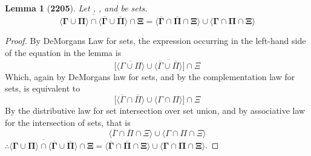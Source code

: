 \documentclass[preview]{standalone}
\newtheorem*{lemma*}{Lemma}
\begin{document}
\begin{lemma*}[\textbf{2205}] \color{black}
    Let \bm{$\Gamma$}, \bm{$\Pi$}, and \bm{$\Xi$} be sets.
    \begin{equation*}
        \bm{
            \overline{
                \Big \langle \Gamma \cup \Pi \Big \rangle
                    \cap
                \Big \langle \overline{\Gamma} \cup \overline{\Pi} \Big \rangle
            }
                \cap
            \Xi
                    =
            \Big \langle \overline{\Gamma} \cap \overline{\Pi} \cap \Xi \Big \rangle
                \cup
            \Big \langle \Gamma \cap \Pi \cap \Xi \Big \rangle
        }
    \end{equation*}
\end{lemma*}
\begin{proof} \color{black}
    By DeMorgans Law for sets, 
    the expression occurring in the left-hand side of the equation in the lemma is
    \begin{equation*}
        \bigg[
            \Big \langle \overline{\Gamma \cup \Pi} \Big \rangle
                \cup
            \Big \langle \overline{\overline{\Gamma} \cup \overline{\Pi}} \Big \rangle
        \bigg]
            \cap
        \Xi
    \end{equation*}
    Which, again by DeMorgans law for sets, and by the complementation law for sets, is equivalent to
    \begin{equation*}
        \bigg[
            \Big \langle \overline{\Gamma} \cap \overline{\Pi} \Big \rangle
                \cup
            \Big \langle \Gamma \cap \Pi \Big \rangle
        \bigg]
            \cap
        \Xi
    \end{equation*}
    By the distributive law for set intersection over set union,
    and by associative law for the intersection of sets, that is
    \begin{equation*}
        \Big \langle \overline{\Gamma} \cap \overline{\Pi} \cap \Xi \Big \rangle
            \cup
        \Big \langle \Gamma \cap \Pi \cap \Xi \Big \rangle
    \end{equation*}
    $\therefore \bm{
        \overline{
            \big \langle \Gamma \cup \Pi \big \rangle
                \cap
            \big \langle \overline{\Gamma} \cup \overline{\Pi} \big \rangle
        }
            \cap
        \Xi
            =
        \big \langle \overline{\Gamma} \cap \overline{\Pi} \cap \Xi \big \rangle
            \cup
        \big \langle \Gamma \cap \Pi \cap \Xi \big \rangle
    }$.
\color{lightgray} \end{proof}
\end{document}
